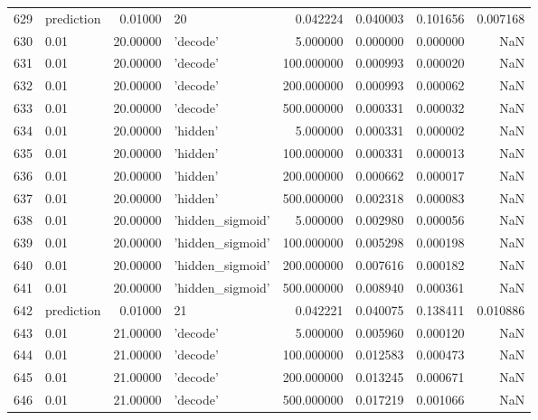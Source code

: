 \documentclass[10pt,a4paper]{article}
\begin{document}
\begin{tabular}{llrlrrrr}
629  &  prediction &   0.01000 &                 20 &    0.042224 &  0.040003 &  0.101656 &  0.007168 \\
630  &        0.01 &  20.00000 &           'decode' &    5.000000 &  0.000000 &  0.000000 &       NaN \\
631  &        0.01 &  20.00000 &           'decode' &  100.000000 &  0.000993 &  0.000020 &       NaN \\
632  &        0.01 &  20.00000 &           'decode' &  200.000000 &  0.000993 &  0.000062 &       NaN \\
633  &        0.01 &  20.00000 &           'decode' &  500.000000 &  0.000331 &  0.000032 &       NaN \\
634  &        0.01 &  20.00000 &           'hidden' &    5.000000 &  0.000331 &  0.000002 &       NaN \\
635  &        0.01 &  20.00000 &           'hidden' &  100.000000 &  0.000331 &  0.000013 &       NaN \\
636  &        0.01 &  20.00000 &           'hidden' &  200.000000 &  0.000662 &  0.000017 &       NaN \\
637  &        0.01 &  20.00000 &           'hidden' &  500.000000 &  0.002318 &  0.000083 &       NaN \\
638  &        0.01 &  20.00000 &   'hidden\_sigmoid' &    5.000000 &  0.002980 &  0.000056 &       NaN \\
639  &        0.01 &  20.00000 &   'hidden\_sigmoid' &  100.000000 &  0.005298 &  0.000198 &       NaN \\
640  &        0.01 &  20.00000 &   'hidden\_sigmoid' &  200.000000 &  0.007616 &  0.000182 &       NaN \\
641  &        0.01 &  20.00000 &   'hidden\_sigmoid' &  500.000000 &  0.008940 &  0.000361 &       NaN \\
642  &  prediction &   0.01000 &                 21 &    0.042221 &  0.040075 &  0.138411 &  0.010886 \\
643  &        0.01 &  21.00000 &           'decode' &    5.000000 &  0.005960 &  0.000120 &       NaN \\
644  &        0.01 &  21.00000 &           'decode' &  100.000000 &  0.012583 &  0.000473 &       NaN \\
645  &        0.01 &  21.00000 &           'decode' &  200.000000 &  0.013245 &  0.000671 &       NaN \\
646  &        0.01 &  21.00000 &           'decode' &  500.000000 &  0.017219 &  0.001066 &       NaN \\

\end{tabular}
\end{document}
